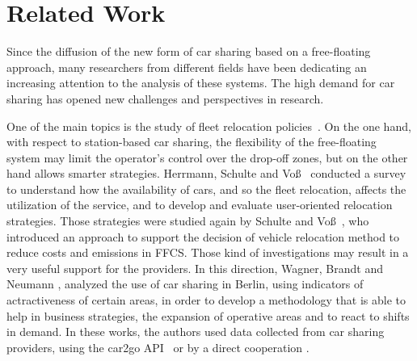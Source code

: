 \section{Related Work}
\label{sec:related}
Since the diffusion of the new form of car sharing based on a free-floating approach, many researchers from different fields have been dedicating an increasing attention to the analysis of these systems.
The high demand for car sharing has opened new challenges and perspectives in research.

One of the main topics is the study of fleet relocation policies~\cite{Herrmann2014,Schulte2015,Wagner2015}. On the one hand, with respect to station-based car sharing, the flexibility of the free-floating system may limit the operator's control over the drop-off zones, but on the other hand allows smarter strategies. 
Herrmann, Schulte and Voß~\cite{Herrmann2014} conducted a survey to understand how the availability of cars, and so the fleet relocation, affects the utilization of the service, and to develop and evaluate user-oriented relocation strategies.
Those strategies were studied again by Schulte and Voß~\cite{Schulte2015}, who introduced an approach to support the decision of vehicle relocation method to reduce costs and emissions in FFCS.
Those kind of investigations may result in a very useful support for the providers. In this direction, Wagner, Brandt and Neumann \cite{Wagner2015}, analyzed the use of car sharing in Berlin, using indicators of actractiveness of certain areas, in order to develop a methodology that is able to help in business strategies, the expansion of operative areas and to react to shifts in demand. In these works, the authors used data collected from car sharing providers, using the car2go API~\cite{Herrmann2014,Schulte2015} or by a direct cooperation \cite{Wagner2015}.

